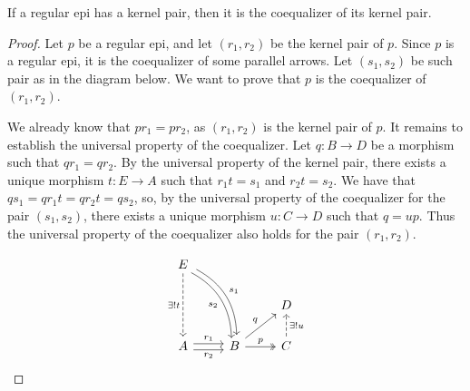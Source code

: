 \begin{mainbox}{}
    \begin{prop}\label{coeq of the kernel pair}
        If a regular epi has a kernel pair, then it is the coequalizer of its kernel pair.
    \end{prop}
\end{mainbox}

\begin{subbox}{}
    \begin{proof}
Let $p$ be a regular epi, and let $(r_1,r_2)$ be the kernel pair of $p$. Since $p$ is a regular epi, it is the coequalizer of some parallel arrows. Let $(s_1,s_2)$ be such pair as in the diagram below. We want to prove that $p$ is the coequalizer of $(r_1,r_2)$.

We already know that $pr_1=pr_2$, as $(r_1,r_2)$ is the kernel pair of $p$. It remains to establish the universal property of the coequalizer. Let $q:B \to D$ be a morphism such that $qr_1=qr_2$. By the universal property of the kernel pair, there exists a unique morphism $t: E \to A$ such that $r_1t=s_1$ and $r_2t=s_2$. We have that $qs_1=qr_1t=qr_2t=qs_2$, so, by the universal property of the coequalizer for the pair $(s_1,s_2)$, there exists a unique morphism $u: C \to D$ such that $q=up$. Thus the universal property of the coequalizer also holds for the pair $(r_1,r_2)$.


\[
\begin{tikzcd}
    E \arrow[rdd, "s_2"', bend left, shift right] \arrow[rdd, "s_1", bend left, shift left] \arrow[dd, "\exists!t"', dashed] &                                             &                                     \\
                                                                                                                             &                                             & D                                   \\
    A \arrow[r, "r_1", shift left] \arrow[r, "r_2"', shift right]                                                            & B \arrow[ru, "q"] \arrow[r, "p", two heads] & C \arrow[u, "\exists ! u"', dashed]
    \end{tikzcd}
    \]
    
    \end{proof}
\end{subbox}

